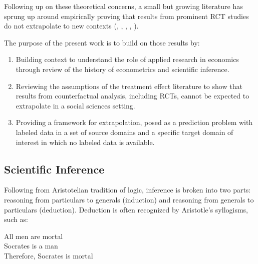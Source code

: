 \documentclass[a4paper,12pt]{article}
\begin{document}

Following up on these theoretical concerns, a small but growing literature has sprung up around empirically proving that results from prominent RCT studies do not extrapolate to new contexts (\cite{LantPritchett&JustinSandefur2016}, \cite{Gechter2015}, \cite{Allcott2015}, \cite{Bisbee2017}, \cite{Rosenzweig2019}). 

The purpose of the present work is to build on those results by:

\begin{enumerate}
\item Building context to understand the role of applied research in economics through review of the history of econometrics and scientific inference.
\item Reviewing the assumptions of the treatment effect literature to show that results from counterfactual analysis, including RCTs, cannot be expected to extrapolate in a social sciences setting.  
\item Providing a framework for extrapolation, posed as a prediction problem with labeled data in a set of source domains and a specific target domain of interest in which no labeled data is available. 
\end{enumerate}




\subsection*{Scientific Inference}

Following from Aristotelian tradition of logic, inference is broken into two parts: reasoning from particulars to generals (induction) and reasoning from generals to particulars (deduction). Deduction is often recognized by Aristotle's syllogisms, such as:


\begin{displayquote}
All men are mortal \\
Socrates is a man  \\
Therefore, Socrates is mortal
\end{displayquote}
\end{document}
